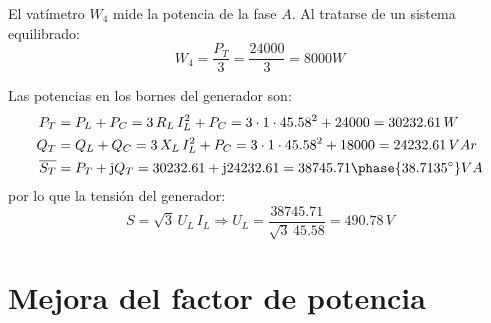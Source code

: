 \documentclass[11pt]{book} %
\begin{document}
\begin{example}
El vatímetro $W_4$ mide la potencia de la fase $A$. Al tratarse de un sistema equilibrado:
\begin{equation*}
    W_4=\dfrac{P_T}{3}=\dfrac{24000}{3}=8000W
\end{equation*}

Las potencias en los bornes del generador son:
\begin{align*}
    P_T&=P_L+P_C=3\,R_L\,I_L^2+P_C=3\cdot 1\cdot 45.58^2+24000=30232.61\,W\\
    Q_T&=Q_L+Q_C=3\,X_L\,I_L^2+P_C=3\cdot 1\cdot 45.58^2+18000=24232.61\,VAr\\
    \overline{S_T}&=P_T+\mathrm{j}Q_T=30232.61+\mathrm{j}24232.61=38745.71\phase{38.7135^\circ} VA
\end{align*}
por lo que la tensión del generador:
\begin{equation*}
    S=\sqrt{3}\,U_L\, I_L\Rightarrow U_L=\dfrac{38745.71}{\sqrt{3}\,45.58}=490.78\,V
\end{equation*}
\end{example}

		\section{Mejora del factor de potencia}
		
\end{document}
